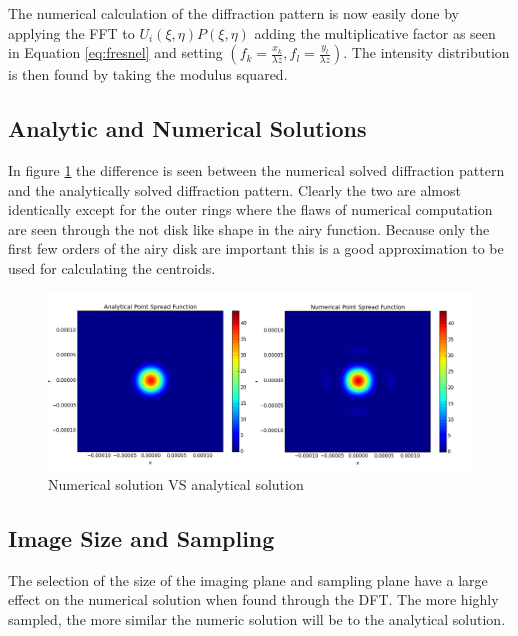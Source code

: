 The numerical calculation of the diffraction pattern is now easily done by applying the FFT to $U_i(\xi,\eta)P(\xi,\eta)$ adding the multiplicative factor as seen in Equation \eqref{eq:fresnel} and setting $(f_k=\frac{x_k}{\lambda z},f_l=\frac{y_l}{\lambda z})$. The intensity distribution is then found by taking the modulus squared.

\subsection{Analytic and Numerical Solutions}
In figure \ref{fig:num_vs_an} the difference is seen between the numerical solved diffraction pattern and the analytically solved diffraction pattern. Clearly the two are almost identically except for the outer rings where the flaws of numerical computation are seen through the not disk like shape in the airy function. Because only the first few orders of the airy disk are important this is a good approximation to be used for calculating the centroids. 
\begin{figure}[H]
	\centering
		\includegraphics[width=1.0\textwidth]{figures/num_vs_an.png}
	\caption{Numerical solution VS analytical solution}
	\label{fig:num_vs_an}
\end{figure}

\subsection{Image Size and Sampling}
The selection of the size of the imaging plane and sampling plane have a large effect on the numerical solution when found through the DFT.  The more highly sampled, the more similar the numeric solution will be to the analytical solution.  



